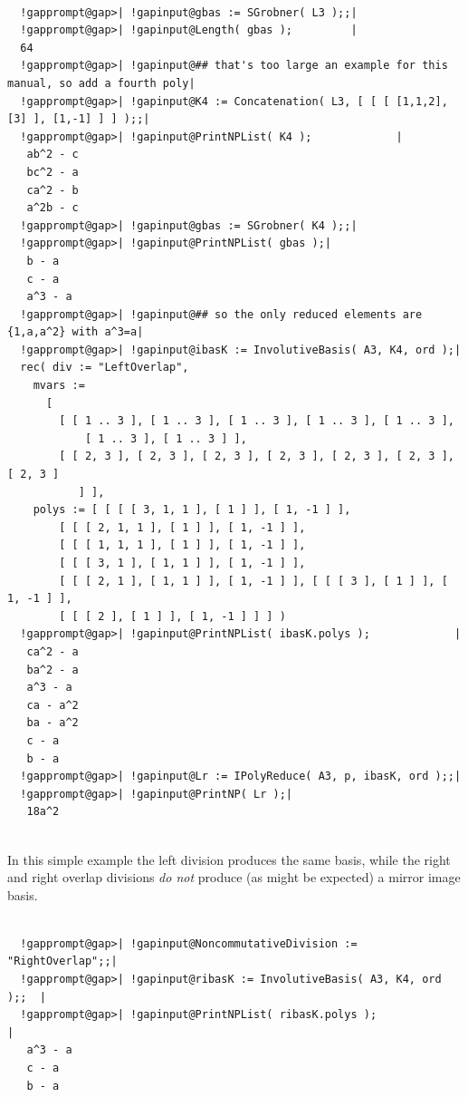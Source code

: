 \documentclass[a4paper,11pt]{report}
\begin{document}
{{ 
\begin{Verbatim}[commandchars=!@|,fontsize=\small,frame=single,label=Example]
  
  !gapprompt@gap>| !gapinput@gbas := SGrobner( L3 );;|
  !gapprompt@gap>| !gapinput@Length( gbas );         |
  64
  !gapprompt@gap>| !gapinput@## that's too large an example for this manual, so add a fourth poly|
  !gapprompt@gap>| !gapinput@K4 := Concatenation( L3, [ [ [ [1,1,2], [3] ], [1,-1] ] ] );;|
  !gapprompt@gap>| !gapinput@PrintNPList( K4 );             |
   ab^2 - c 
   bc^2 - a 
   ca^2 - b 
   a^2b - c 
  !gapprompt@gap>| !gapinput@gbas := SGrobner( K4 );;|
  !gapprompt@gap>| !gapinput@PrintNPList( gbas );|
   b - a 
   c - a 
   a^3 - a 
  !gapprompt@gap>| !gapinput@## so the only reduced elements are {1,a,a^2} with a^3=a|
  !gapprompt@gap>| !gapinput@ibasK := InvolutiveBasis( A3, K4, ord );|
  rec( div := "LeftOverlap", 
    mvars := 
      [ 
        [ [ 1 .. 3 ], [ 1 .. 3 ], [ 1 .. 3 ], [ 1 .. 3 ], [ 1 .. 3 ], 
            [ 1 .. 3 ], [ 1 .. 3 ] ], 
        [ [ 2, 3 ], [ 2, 3 ], [ 2, 3 ], [ 2, 3 ], [ 2, 3 ], [ 2, 3 ], [ 2, 3 ] 
           ] ], 
    polys := [ [ [ [ 3, 1, 1 ], [ 1 ] ], [ 1, -1 ] ], 
        [ [ [ 2, 1, 1 ], [ 1 ] ], [ 1, -1 ] ], 
        [ [ [ 1, 1, 1 ], [ 1 ] ], [ 1, -1 ] ], 
        [ [ [ 3, 1 ], [ 1, 1 ] ], [ 1, -1 ] ], 
        [ [ [ 2, 1 ], [ 1, 1 ] ], [ 1, -1 ] ], [ [ [ 3 ], [ 1 ] ], [ 1, -1 ] ], 
        [ [ [ 2 ], [ 1 ] ], [ 1, -1 ] ] ] )
  !gapprompt@gap>| !gapinput@PrintNPList( ibasK.polys );             |
   ca^2 - a 
   ba^2 - a 
   a^3 - a 
   ca - a^2 
   ba - a^2 
   c - a 
   b - a 
  !gapprompt@gap>| !gapinput@Lr := IPolyReduce( A3, p, ibasK, ord );;|
  !gapprompt@gap>| !gapinput@PrintNP( Lr );|
   18a^2 
  
\end{Verbatim}
 In this simple example the left division produces the same basis, while the
right and right overlap divisions \emph{do not} produce (as might be expected) a mirror image basis. 

 
\begin{Verbatim}[commandchars=!@|,fontsize=\small,frame=single,label=Example]
  
  !gapprompt@gap>| !gapinput@NoncommutativeDivision := "RightOverlap";;|
  !gapprompt@gap>| !gapinput@ribasK := InvolutiveBasis( A3, K4, ord );;  |
  !gapprompt@gap>| !gapinput@PrintNPList( ribasK.polys );                |
   a^3 - a 
   c - a 
   b - a 
  
\end{Verbatim}
 }

}
\end{document}
